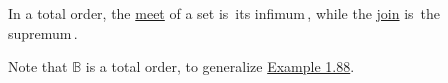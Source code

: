 In a total order, the \hyperref[D1.81]{meet} of a set is \,its infimum\,, while the \hyperref[D1.81]{join} is \,the supremum\,.

  Note that $\mathbb{B}$ is a total order, to generalize \hyperref[X1.88]{Example 1.88}.